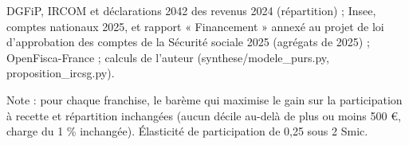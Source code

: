 DGFiP, IRCOM et déclarations 2042 des revenus 2024 (répartition) ; Insee, comptes nationaux 2025, et rapport « Financement » annexé au projet de loi d'approbation des comptes de la Sécurité sociale 2025 (agrégats de 2025) ; OpenFisca-France ; calculs de l'auteur (synthese/modele\_purs.py, proposition\_ircsg.py).\par Note : pour chaque franchise, le barème qui maximise le gain sur la participation à recette et répartition inchangées (aucun décile au-delà de plus ou moins 500 \euro{}, charge du 1 \% inchangée). Élasticité de participation de 0,25 sous 2 Smic.
